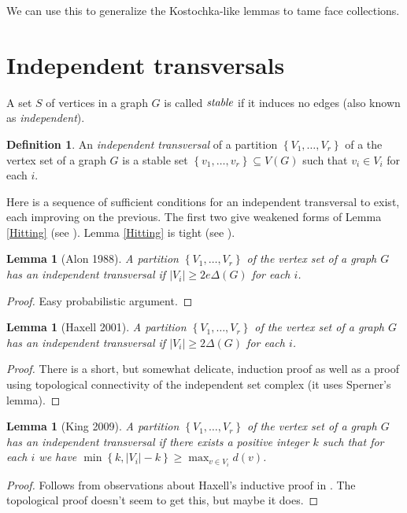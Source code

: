 \documentclass[12pt]{article}
\theoremstyle{plain}
\newtheorem{lem}[thm]{Lemma}
\theoremstyle{definition}
\newtheorem{defn}{Definition}
\theoremstyle{remark}
\newcommand{\set}[1]{\left\{ #1 \right\}}
\newcommand{\card}[1]{\left|#1\right|}
\begin{document}
We can use this to generalize the Kostochka-like lemmas to tame face collections.

\section{Independent transversals}
A set $S$ of vertices in a graph $G$ is called $\emph{stable}$ if it induces no edges (also known as \emph{independent}).

\begin{defn}
An \emph{independent transversal} of a partition $\set{V_1, \ldots, V_r}$ of a the vertex set of a graph $G$ is a stable set $\set{v_1, \ldots, v_r} \subseteq V(G)$ such that $v_i \in V_i$ for each $i$.
\end{defn}

Here is a sequence of sufficient conditions for an independent transversal to exist, each improving on the previous.  The first two give weakened forms of Lemma \ref{Hitting} (see \cite{rabernhitting}).  Lemma \ref{Hitting} is tight (see \cite{KingAXiv}).

\begin{lem}[Alon 1988]
A partition $\set{V_1, \ldots, V_r}$ of the vertex set of a graph $G$ has an independent transversal if $\card{V_i} \geq 2e\Delta(G)$ for each $i$.
\end{lem}
\begin{proof}
Easy probabilistic argument.
\end{proof}

\begin{lem}[Haxell 2001]
A partition $\set{V_1, \ldots, V_r}$ of the vertex set of a graph $G$ has an independent transversal if $\card{V_i} \geq 2\Delta(G)$ for each $i$.
\end{lem}
\begin{proof}
There is a short, but somewhat delicate, induction proof as well as a proof using topological connectivity of the independent set complex (it uses Sperner's lemma).
\end{proof}

\begin{lem}[King 2009]\label{KingLemma}
A partition $\set{V_1, \ldots, V_r}$ of the vertex set of a graph $G$ has an independent transversal if there exists a positive integer $k$ such that for 
each $i$ we have $\min \set{k, \card{V_i} - k} \geq \max_{v \in V_i} d(v)$.
\end{lem}
\begin{proof}
Follows from observations about Haxell's inductive proof in \cite{aharoni2007independent}.  The topological proof doesn't seem to get this, but maybe it does.
\end{proof}
\end{document}
